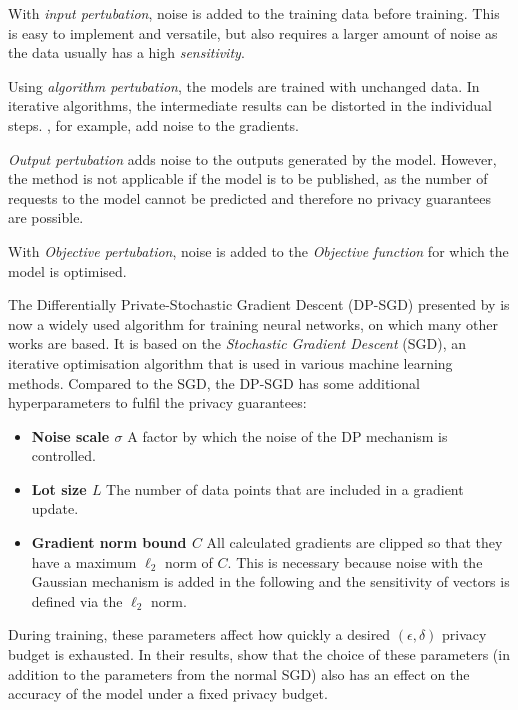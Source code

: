 With \textit{input pertubation}, noise is added to the training data before training. This is easy to implement and versatile, but also requires a larger amount of noise as the data usually has a high \textit{sensitivity}.

Using \textit{algorithm pertubation}, the models are trained with unchanged data. In iterative algorithms, the intermediate results can be distorted in the individual steps. \textcite{abadi:2016}, for example, add noise to the gradients.

\textit{Output pertubation} adds noise to the outputs generated by the model. However, the method is not applicable if the model is to be published, as the number of requests to the model cannot be predicted and therefore no privacy guarantees are possible.

With \textit{Objective pertubation}, noise is added to the \textit{Objective function} for which the model is optimised.

The Differentially Private-Stochastic Gradient Descent (DP-SGD) presented by \textcite{abadi:2016} is now a widely used algorithm for training neural networks, on which many other works are based. It is based on the \textit{Stochastic Gradient Descent} (SGD), an iterative optimisation algorithm that is used in various machine learning methods. Compared to the SGD, the DP-SGD has some additional hyperparameters to fulfil the privacy guarantees:

\begin{itemize}
  \item \textbf{Noise scale $\sigma$} A factor by which the noise of the DP mechanism is controlled. 
  \item \textbf{Lot size $L$} The number of data points that are included in a gradient update.
  \item \textbf{Gradient norm bound $C$} All calculated gradients are clipped so that they have a maximum $\ell_2$ norm of $C$. This is necessary because noise with the Gaussian mechanism is added in the following and the sensitivity of vectors is defined via the $\ell_2$ norm. 
\end{itemize}

During training, these parameters affect how quickly a desired $(\epsilon, \delta)$ privacy budget is exhausted. In their results, \textcite{abadi:2016} show that the choice of these parameters (in addition to the parameters from the normal SGD) also has an effect on the accuracy of the model under a fixed privacy budget.

